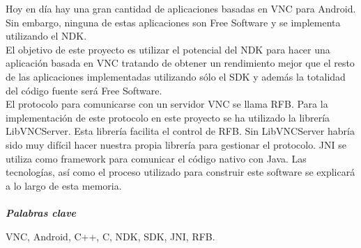 
Hoy en día hay una gran cantidad de aplicaciones basadas en VNC para Android. Sin embargo, ninguna de estas aplicaciones son Free Software y se implementa utilizando el NDK.\\

El objetivo de este proyecto es utilizar el potencial del NDK para hacer una aplicación basada en VNC tratando de obtener un rendimiento mejor que el resto de las aplicaciones implementadas utilizando sólo el SDK y además la totalidad del código fuente será Free Software.\\

El protocolo para comunicarse con un servidor VNC se llama RFB. Para la implementación de este protocolo en este proyecto se ha utilizado la librería LibVNCServer. Esta librería facilita el control de RFB. Sin LibVNCServer habría sido muy difícil hacer nuestra propia librería para gestionar el protocolo. JNI se utiliza como framework para comunicar el código nativo con Java. Las tecnologías, así como el proceso utilizado para construir este software se explicará a lo largo de esta memoria. 
\\ \mbox{ } \\
\textit{\textbf{Palabras clave}}

VNC, Android, C++, C, NDK, SDK, JNI, RFB.
